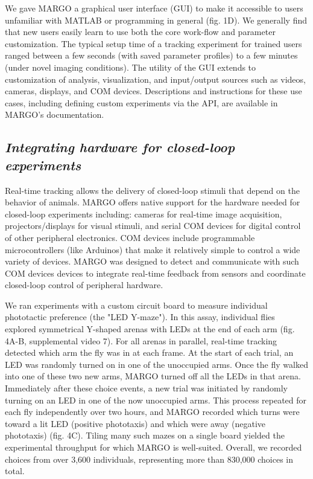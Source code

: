 \documentclass[12pt,letterpaper]{article}
\begin{document}
We gave MARGO a graphical user interface (GUI) to make it accessible to users unfamiliar with MATLAB or programming in general (fig. 1D). We generally find that new users easily learn to use both the core work-flow and parameter customization. The typical setup time of a tracking experiment for trained users ranged between a few seconds (with saved parameter profiles) to a few minutes (under novel imaging conditions). The utility of the GUI extends to customization of analysis, visualization, and input/output sources such as videos, cameras, displays, and COM devices. Descriptions and instructions for these use cases, including defining custom experiments via the API, are available in MARGO's documentation.

\subsection*{\textit{Integrating hardware for closed-loop experiments}}

Real-time tracking allows the delivery of closed-loop stimuli that depend on the behavior of animals. MARGO offers native support for the hardware needed for closed-loop experiments including: cameras for real-time image acquisition, projectors/displays for visual stimuli, and serial COM devices for digital control of other peripheral electronics. COM devices include programmable microcontrollers (like Arduinos) that make it relatively simple to control a wide variety of devices. MARGO was designed to detect and communicate with such COM devices devices to integrate real-time feedback from sensors and coordinate closed-loop control of peripheral hardware. 

We ran experiments with a custom circuit board to measure individual phototactic preference (the "LED Y-maze"). In this assay, individual flies explored symmetrical Y-shaped arenas with LEDs at the end of each arm (fig. 4A-B, supplemental video 7). For all arenas in parallel, real-time tracking detected which arm the fly was in at each frame. At the start of each trial, an LED was randomly turned on in one of the unoccupied arms. Once the fly walked into one of these two new arms, MARGO turned off all the LEDs in that arena. Immediately after these choice events, a new trial was initiated by randomly turning on an LED in one of the now unoccupied arms. This process repeated for each fly independently over two hours, and MARGO recorded which turns were toward a lit LED (positive phototaxis) and which were away (negative phototaxis) (fig. 4C). Tiling many such mazes on a single board yielded the experimental throughput for which MARGO is well-suited. Overall, we recorded choices from over 3,600 individuals, representing more than 830,000 choices in total.
\end{document}
